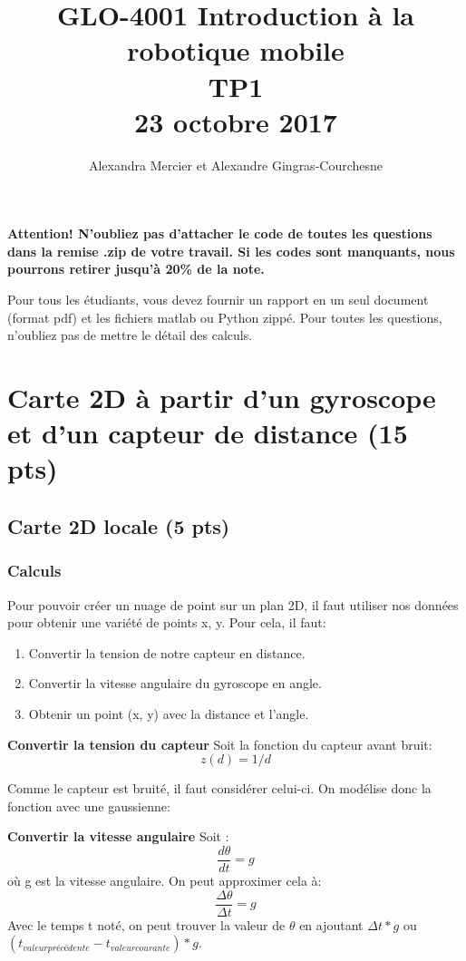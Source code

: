 \documentclass[12pt]{article}
\begin{document}
\title{GLO-4001 Introduction à la robotique mobile \\  TP1 \\ 23 octobre 2017}
\author{Alexandra Mercier et Alexandre Gingras-Courchesne}
\maketitle


{\bf Attention! N'oubliez pas d'attacher le code de toutes les questions dans la remise .zip de votre travail. Si les codes sont manquants, nous pourrons retirer jusqu'à 20\% de la note. }

Pour tous les étudiants, vous devez fournir un rapport en un seul document (format pdf) et les fichiers matlab ou Python zippé. Pour toutes les questions, n'oubliez pas de mettre le détail des calculs.

\section{Carte 2D à partir d'un gyroscope et d'un capteur de distance (15 pts)}

\subsection{Carte 2D locale (5 pts)}
\label{CarteLocale}

\subsubsection{Calculs}
Pour pouvoir créer un nuage de point sur un plan 2D, il faut utiliser nos données pour obtenir une variété de points x, y.
Pour cela, il faut:
\begin{enumerate}
        \item Convertir la tension de notre capteur en distance.
        \item Convertir la vitesse angulaire du gyroscope en angle.
        \item Obtenir un point (x, y) avec la distance et l'angle.
\end{enumerate}

\textbf{Convertir la tension du capteur}
Soit la fonction du capteur avant bruit:
\[ z(d) = 1/d \]

Comme le capteur est bruité, il faut consid\'erer celui-ci. On mod\'elise donc la fonction avec une gaussienne:

\textbf{Convertir la vitesse angulaire}
Soit :
\[ \frac{d\theta}{dt} = g \] o\`u g est la vitesse angulaire.
On peut approximer cela \`a:
\[ \frac{\Delta \theta}{\Delta t}  = g\]
Avec le temps t noté, on peut trouver la valeur de $\theta$ en ajoutant $\Delta t * g $ ou $ (t_{valeur précédente} - t_{valeur courante}) * g$.
\end{document}
